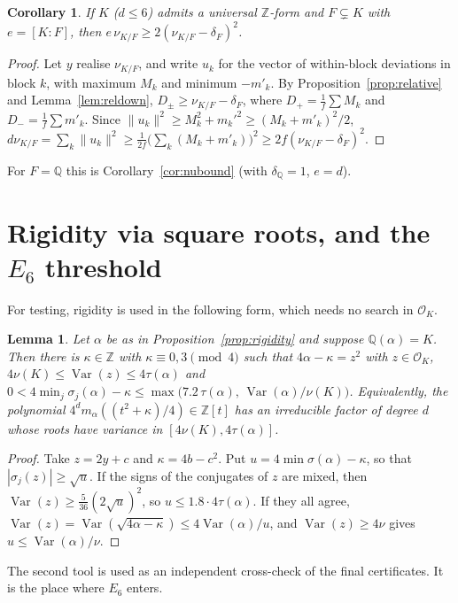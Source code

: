 \documentclass[11pt]{amsart}
\newtheorem{lemma}[theorem]{Lemma}
\newtheorem{corollary}[theorem]{Corollary}
\theoremstyle{definition}
\DeclareMathOperator{\Var}{Var}
\newcommand{\OK}{\mathcal{O}_K}
\newcommand{\Q}{\mathbb{Q}}
\newcommand{\Z}{\mathbb{Z}}
\newcommand{\nurel}{\nu_{K/F}}
\begin{document}
\begin{corollary}\label{cor:relbound}
If $K$ ($d\le6$) admits a universal $\Z$-form and $F\subsetneq K$ with $e=[K:F]$, then
$e\,\nurel\ge2(\nurel-\delta_F)^2$.
\end{corollary}

\begin{proof}
Let $y$ realise $\nurel$, and write $u_k$ for the vector of within-block deviations in block
$k$, with maximum $M_k$ and minimum $-m'_k$.  By Proposition~\ref{prop:relative} and
Lemma~\ref{lem:reldown}, $D_\pm\ge\nurel-\delta_F$, where $D_+=\frac1f\sum M_k$ and
$D_-=\frac1f\sum m'_k$.  Since $\|u_k\|^2\ge M_k^2+m_k'^2\ge(M_k+m'_k)^2/2$,
$d\nurel=\sum_k\|u_k\|^2\ge\frac1{2f}\bigl(\sum_k(M_k+m'_k)\bigr)^2\ge2f(\nurel-\delta_F)^2$.
\end{proof}

For $F=\Q$ this is Corollary~\ref{cor:nubound} (with $\delta_\Q=1$, $e=d$).

\section{Rigidity via square roots, and the \texorpdfstring{$E_6$}{E6} threshold}\label{sec:e6}

For testing, rigidity is used in the following form, which needs no search in $\OK$.

\begin{lemma}\label{lem:sqshape}
Let $\alpha$ be as in Proposition~\ref{prop:rigidity} and suppose $\Q(\alpha)=K$.  Then there
is $\kappa\in\Z$ with $\kappa\equiv0,3\pmod4$ such that $4\alpha-\kappa=z^2$ with $z\in\OK$,
$4\nu(K)\le\Var(z)\le4\tau(\alpha)$ and
$0<4\min_j\sigma_j(\alpha)-\kappa\le\max\bigl(7.2\,\tau(\alpha),\,\Var(\alpha)/\nu(K)\bigr)$.
Equivalently, the polynomial $4^d m_\alpha((t^2+\kappa)/4)\in\Z[t]$ has an irreducible factor
of degree $d$ whose roots have variance in $[4\nu(K),4\tau(\alpha)]$.
\end{lemma}

\begin{proof}
Take $z=2y+c$ and $\kappa=4b-c^2$.  Put $u=4\min\sigma(\alpha)-\kappa$, so that
$|\sigma_j(z)|\ge\sqrt u$.  If the signs of the conjugates of $z$ are mixed, then
$\Var(z)\ge\frac5{36}(2\sqrt u)^2$, so $u\le1.8\cdot4\tau(\alpha)$.  If they all agree,
$\Var(z)=\Var(\sqrt{4\alpha-\kappa})\le4\Var(\alpha)/u$, and $\Var(z)\ge4\nu$ gives
$u\le\Var(\alpha)/\nu$.
\end{proof}

The second tool is used as an independent cross-check of the final certificates.  It is the
place where $E_6$ enters.
\end{document}
